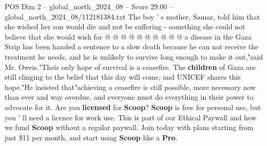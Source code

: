 \begin{textsample}{POS Dim 2 – global\_north\_2024\_08 – Score 29.00 – global\_north\_2024\_08/112181384.txt}
The boy ' s mother, Samar, told him that she wished her son would die and not be suffering - something she could not believe that she would wish for @ @ @ @ @ @ @ @ @ @ a disease in the Gaza Strip has been handed a sentence to a slow death because he can not receive the treatment he needs, and he is unlikely to survive long enough to make it out,"said Mr.
Oweis."Their only hope of survival is a ceasefire.
The \textbf{children} of Gaza are still clinging to the belief that this day will come, and UNICEF shares this hope."He insisted that"achieving a ceasefire is still possible, more necessary now than ever and way overdue, and everyone must do everything in their power to advocate for it.
Are you \textbf{licensed} for \textbf{Scoop}? \textbf{Scoop} is free for personal use, but you ' ll need a licence for work use.
This is part of our Ethical Paywall and how we fund \textbf{Scoop} without a regular paywall.
Join today with plans starting from just \$11 per month, and start using \textbf{Scoop} like a \textbf{Pro}.

\end{textsample}
